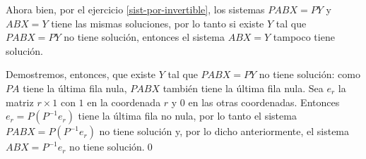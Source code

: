\begin{enumerate}[topsep=6pt,itemsep=.4cm]
Ahora bien, por el ejercicio \ref{sist-por-invertible}, los sistemas $PABX=PY$ y $ABX=Y$ tiene las mismas soluciones, por lo tanto si existe $Y$ tal que $PABX=PY$ no tiene solución, entonces el sistema $ABX=Y$ tampoco tiene solución. 

Demostremos, entonces, que existe $Y$  tal que $PABX=PY$ no tiene solución: como $PA$ tiene la última fila nula, $PABX$ también tiene la última fila nula. Sea $e_r$ la matriz $r \times 1$ con $1$ en la coordenada $r$ y $0$  en las otras coordenadas. Entonces $e_r = P(P^{-1}e_r)$  tiene la última fila no nula, por lo tanto el sistema $PABX=P(P^{-1}e_r)$ no tiene solución y, por lo dicho anteriormente, el sistema   $ABX=P^{-1}e_r$ no tiene solución.\qed 


\end{enumerate}


